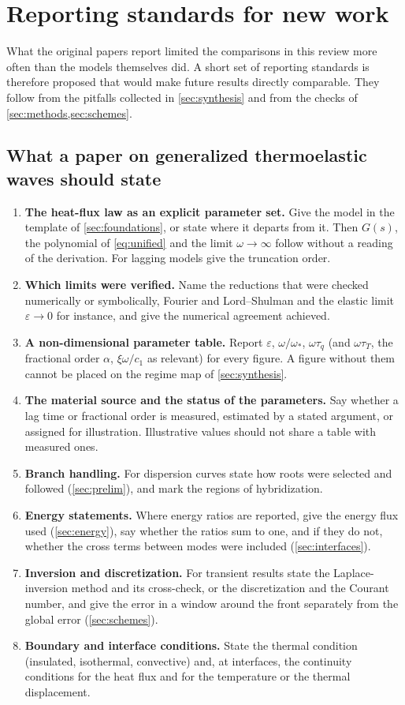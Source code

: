 \section{Reporting standards for new work}\label{sec:reporting}

What the original papers report limited the comparisons in this review more often than the models themselves did. A short set of reporting standards is therefore proposed that would make future results directly comparable. They follow from the pitfalls collected in \cref{sec:synthesis} and from the checks of \cref{sec:methods,sec:schemes}.

\subsection{What a paper on generalized thermoelastic waves should state}
\begin{enumerate}
\item \textbf{The heat-flux law as an explicit parameter set.} Give the model in the template of \cref{sec:foundations}, or state where it departs from it. Then $G(s)$, the polynomial of \cref{eq:unified} and the limit $\omega\to\infty$ follow without a reading of the derivation. For lagging models give the truncation order.
\item \textbf{Which limits were verified.} Name the reductions that were checked numerically or symbolically, Fourier and Lord--Shulman and the elastic limit $\varepsilon\to0$ for instance, and give the numerical agreement achieved.
\item \textbf{A non-dimensional parameter table.} Report $\varepsilon$, $\omega/\omega_*$, $\omega\tau_q$ (and $\omega\tau_T$, the fractional order $\alpha$, $\xi\omega/c_1$ as relevant) for every figure. A figure without them cannot be placed on the regime map of \cref{sec:synthesis}.
\item \textbf{The material source and the status of the parameters.} Say whether a lag time or fractional order is measured, estimated by a stated argument, or assigned for illustration. Illustrative values should not share a table with measured ones.
\item \textbf{Branch handling.} For dispersion curves state how roots were selected and followed (\cref{sec:prelim}), and mark the regions of hybridization.
\item \textbf{Energy statements.} Where energy ratios are reported, give the energy flux used (\cref{sec:energy}), say whether the ratios sum to one, and if they do not, whether the cross terms between modes were included (\cref{sec:interfaces}).
\item \textbf{Inversion and discretization.} For transient results state the Laplace-inversion method and its cross-check, or the discretization and the Courant number, and give the error in a window around the front separately from the global error (\cref{sec:schemes}).
\item \textbf{Boundary and interface conditions.} State the thermal condition (insulated, isothermal, convective) and, at interfaces, the continuity conditions for the heat flux and for the temperature or the thermal displacement.
\end{enumerate}

